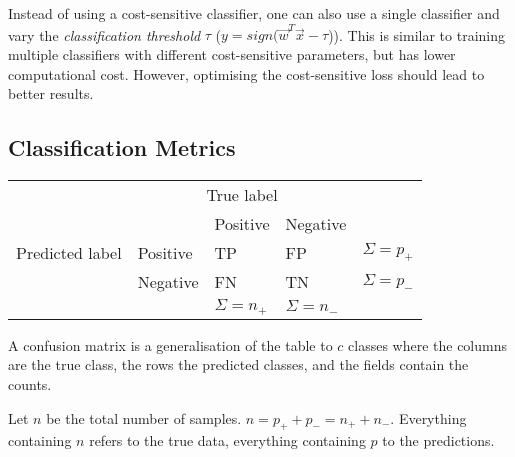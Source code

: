 Instead of using a cost-sensitive classifier,
one can also use a single classifier and vary the
\emph{classification threshold} $\tau$
($y = sign(\vec{w}^T \vec{x} - \tau$)).
This is similar to training multiple classifiers with
different cost-sensitive parameters, but has lower
computational cost.
However, optimising the cost-sensitive loss should lead to better results.


\subsection{Classification Metrics}
\begin{table}[h]
	\begin{tabular}{lllll}
		& \multicolumn{3}{c}{True label}                                                                &      \\ \cline{3-4}
		\multirow{3}{*}{Predicted label} & \multicolumn{1}{l|}{}         & \multicolumn{1}{l|}{Positive} & \multicolumn{1}{l|}{Negative} &      \\ \cline{2-4}
		& \multicolumn{1}{l|}{Positive} & \multicolumn{1}{l|}{TP}       & \multicolumn{1}{l|}{FP}       & $\Sigma = p_{+}$ \\ \cline{2-4}
		& \multicolumn{1}{l|}{Negative} & \multicolumn{1}{l|}{FN}       & \multicolumn{1}{l|}{TN}       & $\Sigma = p_{-}$ \\ \cline{2-4}
		&                               & $\Sigma = n_{+}$              & $\Sigma = n_{-}$ &     
	\end{tabular}
\end{table}

A confusion matrix is a generalisation of the
table to $c$ classes where the columns are
the true class, the rows the predicted classes,
and the fields contain the counts.

Let $n$ be the total number of samples.
$n = p_{+} + p_{-} = n_{+} + n_{-}$.
Everything containing $n$ refers to the true data,
everything containing $p$ to the predictions.

